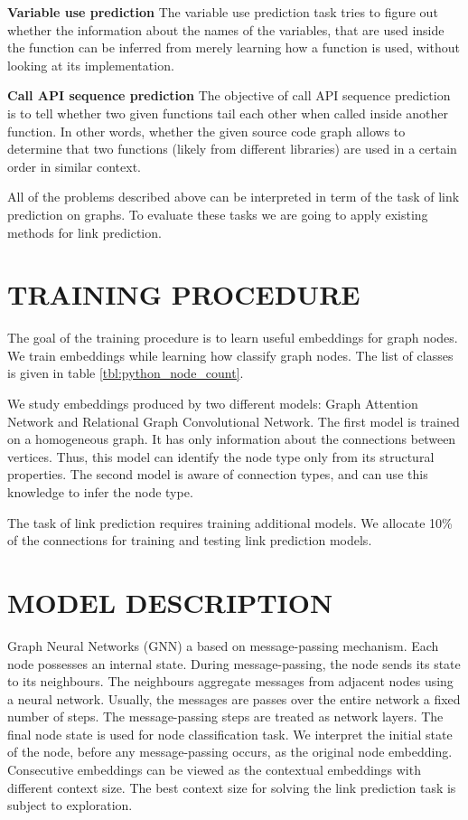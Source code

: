 \documentclass[a4paper,twoside]{article}
\begin{document}
\textbf{Variable use prediction}
The variable use prediction task tries to figure out whether the information about the names of the variables, that are used inside the function can be inferred from merely learning how a function is used, without looking at its implementation.

\textbf{Call API sequence prediction}
The objective of call API sequence prediction is to tell whether two given functions tail each other when called inside another function. In other words, whether the given source code graph allows to determine that two functions (likely from different libraries) are used in a certain order in similar context.

All of the problems described above can be interpreted in term of the task of link prediction on graphs. To evaluate these tasks we are going to apply existing methods for link prediction. 

\section{\uppercase{Training Procedure}}

The goal of the training procedure is to learn useful embeddings for graph nodes. We train embeddings while learning how classify graph nodes. The list of classes is given in table \ref{tbl:python_node_count}.

We study embeddings produced by two different models: Graph Attention Network and Relational Graph Convolutional Network. The first model is trained on a homogeneous graph. It has only information about the connections between vertices. Thus, this model can identify the node type only from its structural properties. The second model is aware of connection types, and can use this knowledge to infer the node type.

The task of link prediction requires training additional models. We allocate 10\% of the connections for training and testing link prediction models.

\section{\uppercase{Model Description}}

Graph Neural Networks (GNN) a based on message-passing mechanism. Each node possesses an internal state. During message-passing, the node sends its state to its neighbours. The neighbours aggregate messages from adjacent nodes using a neural network. Usually, the messages are passes over the entire network a fixed number of steps. The message-passing steps are treated as network layers. The final node state is used for node classification task. We interpret the initial state of the node, before any message-passing occurs, as the original node embedding. Consecutive embeddings can be viewed as the contextual embeddings with different context size. The best context size for solving the link prediction task is subject to exploration.
\end{document}
